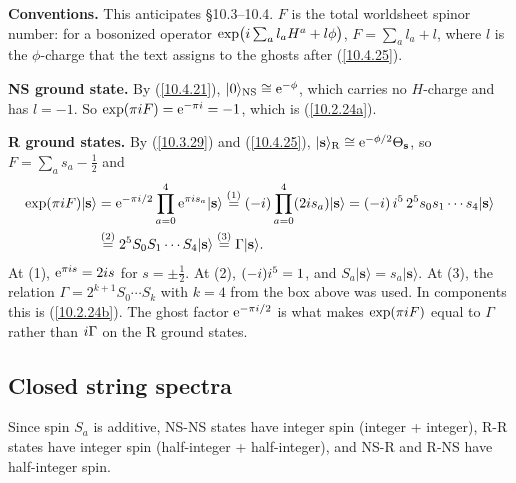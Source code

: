 	\begin{tcolorbox}[breakable]
		\begin{remark}
			\textbf{Conventions.} This anticipates \S10.3--10.4. $F$ is the total worldsheet spinor number: for a bosonized operator $\exp\bigl(i\sum_a l_aH^a+l\phi\bigr)$, $F=\sum_al_a+l$, where $l$ is the $\phi$-charge that the text assigns to the ghosts after (\ref{10.4.25}).

			\textbf{NS ground state.} By (\ref{10.4.21}), $\lvert0\rangle_{\rm NS}\cong\mathrm{e}^{-\phi}$, which carries no $H$-charge and has $l=-1$. So $\exp(\pi i F)=\mathrm{e}^{-\pi i}=-1$, which is (\ref{10.2.24a}).

			\textbf{R ground states.} By (\ref{10.3.29}) and (\ref{10.4.25}), $\lvert\mathbf s\rangle_{\rm R}\cong\mathrm{e}^{-\phi/2}\Theta_{\mathbf s}$, so $F=\sum_as_a-\tfrac12$ and
			\begin{align*}
				\exp(\pi i F)\lvert\mathbf s\rangle&=\mathrm{e}^{-\pi i/2}\prod_{a=0}^{4}\mathrm{e}^{\pi i s_a}\lvert\mathbf s\rangle
				\overset{(1)}{=}(-i)\prod_{a=0}^{4}(2i s_a)\lvert\mathbf s\rangle
				=(-i)\,i^{5}\,2^{5}s_0s_1\cdots s_4\lvert\mathbf s\rangle\\
				&\overset{(2)}{=}2^{5}S_0S_1\cdots S_4\lvert\mathbf s\rangle\overset{(3)}{=}\Gamma\lvert\mathbf s\rangle .
			\end{align*}
			At (1), $\mathrm{e}^{\pi i s}=2i s$ for $s=\pm\tfrac12$. At (2), $(-i)i^{5}=1$, and $S_a\lvert\mathbf s\rangle=s_a\lvert\mathbf s\rangle$. At (3), the relation $\Gamma=2^{k+1}S_0\cdots S_k$ with $k=4$ from the box above was used. In components this is (\ref{10.2.24b}). The ghost factor $\mathrm{e}^{-\pi i/2}$ is what makes $\exp(\pi i F)$ equal to $\Gamma$ rather than $i\Gamma$ on the R ground states.
		\end{remark}
	\end{tcolorbox}
	
	\subsection*{Closed string spectra}
	
	Since spin $S_{a}$ is additive, NS-NS states have integer spin (integer + integer), R-R states have integer spin (half-integer + half-integer), and NS-R and R-NS have half-integer spin. 
	
